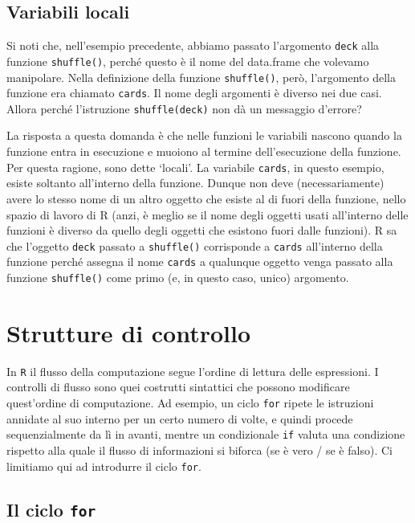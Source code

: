 \documentclass[
  11pt,
]{krantz}
\theoremstyle{definition}
\theoremstyle{definition}
\theoremstyle{definition}
\theoremstyle{definition}
\theoremstyle{remark}
\begin{document}
\hypertarget{variabili-locali}{%
\subsection{Variabili locali}\label{variabili-locali}}

Si noti che, nell'esempio precedente, abbiamo passato l'argomento \texttt{deck} alla funzione \texttt{shuffle()}, perché questo è il nome del data.frame che volevamo manipolare. Nella definizione della funzione \texttt{shuffle()}, però, l'argomento della funzione era chiamato \texttt{cards}. Il nome degli argomenti è diverso nei due casi. Allora perché l'istruzione \texttt{shuffle(deck)} non dà un messaggio d'errore?

La risposta a questa domanda è che nelle funzioni le variabili nascono quando la funzione entra in esecuzione e muoiono al termine dell'esecuzione della funzione. Per questa ragione, sono dette `locali'. La variabile \texttt{cards}, in questo esempio, esiste soltanto all'interno della funzione. Dunque non deve (necessariamente) avere lo stesso nome di un altro oggetto che esiste al di fuori della funzione, nello spazio di lavoro di R (anzi, è meglio se il nome degli oggetti usati all'interno delle funzioni è diverso da quello degli oggetti che esistono fuori dalle funzioni). R sa che l'oggetto \texttt{deck} passato a \texttt{shuffle()} corrisponde a \texttt{cards} all'interno della funzione perché assegna il nome \texttt{cards} a qualunque oggetto venga passato alla funzione \texttt{shuffle()} come primo (e, in questo caso, unico) argomento.

\hypertarget{chapter-strut-contr}{%
\section{Strutture di controllo}\label{chapter-strut-contr}}

In \texttt{R} il flusso della computazione segue l'ordine di lettura delle espressioni. I controlli di flusso sono quei costrutti sintattici che possono modificare quest'ordine di computazione. Ad esempio, un ciclo \texttt{for} ripete le istruzioni annidate al suo interno per un certo numero di volte, e quindi procede sequenzialmente da lì in avanti, mentre un condizionale \texttt{if} valuta una condizione rispetto alla quale il flusso di informazioni si biforca (se è vero / se è falso). Ci limitiamo qui ad introdurre il ciclo \texttt{for}.

\hypertarget{il-ciclo-for}{%
\subsection{\texorpdfstring{Il ciclo \texttt{for}}{Il ciclo for}}\label{il-ciclo-for}}
\end{document}
